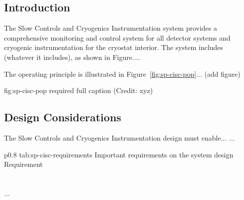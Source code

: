 \subsection{Introduction}
\label{sec:fdsp-slow-cryo-intro}


The Slow Controls and Cryogenics Instrumentation system provides a
comprehensive monitoring and control system for all detector systems
and cryogenic instrumentation for the cryostat interior.
The system includes (whatever it includes), as shown in Figure.... 


The operating principle is illustrated in Figure~\ref{fig:sp-cisc-pop}... (add figure)

\begin{dunefigure}{fig:sp-cisc-pop}
{required full caption (Credit: xyz)}
\end{dunefigure}

\subsection{Design Considerations}
\label{sec:fdsp-slow-cryo-des-consid}


The Slow Controls and Cryogenics Instrumentation design must enable... 
...


\begin{dunetable}
{p{0.8\textwidth}}
{tab:sp-cisc-requirements}
{Important requirements on the system design}   
Requirement  \\ \toprowrule
  \\ \colhline
   \\ \colhline
 ...\\ 
\end{dunetable}




